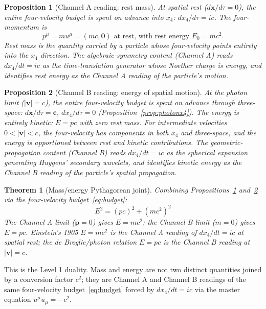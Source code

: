 \documentclass[11pt,a4paper]{article}
\newtheorem{theorem}{Theorem}
\newtheorem{proposition}{Proposition}
\begin{document}
\begin{proposition}[Channel A reading: rest mass]
\label{prop:massA}
At spatial rest ($d\mathbf{x}/d\tau = 0$), the entire four-velocity budget is spent on advance into $x_4$: $dx_4/d\tau = ic$. The four-momentum is
\begin{equation}
p^\mu = m u^\mu = (m c, \mathbf{0})\text{ at rest, with rest energy } E_0 = mc^2.
\end{equation}
Rest mass is the quantity carried by a particle whose four-velocity points entirely into the $x_4$ direction. The algebraic-symmetry content (Channel A) reads $dx_4/dt = ic$ as the time-translation generator whose Noether charge is energy, and identifies rest energy as the Channel A reading of the particle's motion.
\end{proposition}

\begin{proposition}[Channel B reading: energy of spatial motion]
\label{prop:massB}
At the photon limit ($|\mathbf{v}| = c$), the entire four-velocity budget is spent on advance through three-space: $d\mathbf{x}/d\tau = \mathbf{c}$, $dx_4/d\tau = 0$ (Proposition~\ref{prop:photonx4}). The energy is entirely kinetic: $E = pc$ with zero rest mass. For intermediate velocities $0 < |\mathbf{v}| < c$, the four-velocity has components in both $x_4$ and three-space, and the energy is apportioned between rest and kinetic contributions. The geometric-propagation content (Channel B) reads $dx_4/dt = ic$ as the spherical expansion generating Huygens' secondary wavelets, and identifies kinetic energy as the Channel B reading of the particle's spatial propagation.
\end{proposition}

\begin{theorem}[Mass/energy Pythagorean joint]
\label{thm:emc2}
Combining Propositions~\ref{prop:massA} and~\ref{prop:massB} via the four-velocity budget~\eqref{eq:budget}:
\begin{equation}
\boxed{E^2 = (pc)^2 + (mc^2)^2}
\label{eq:energymass}
\end{equation}
The Channel A limit ($\mathbf{p} = 0$) gives $E = mc^2$; the Channel B limit ($m = 0$) gives $E = pc$. Einstein's 1905 $E = mc^2$ is the Channel A reading of $dx_4/dt = ic$ at spatial rest; the de Broglie/photon relation $E = pc$ is the Channel B reading at $|\mathbf{v}| = c$.
\end{theorem}

This is the Level 1 duality. Mass and energy are not two distinct quantities joined by a conversion factor $c^2$; they are Channel A and Channel B readings of the same four-velocity budget~\eqref{eq:budget} forced by $dx_4/dt = ic$ via the master equation $u^\mu u_\mu = -c^2$.
\end{document}

